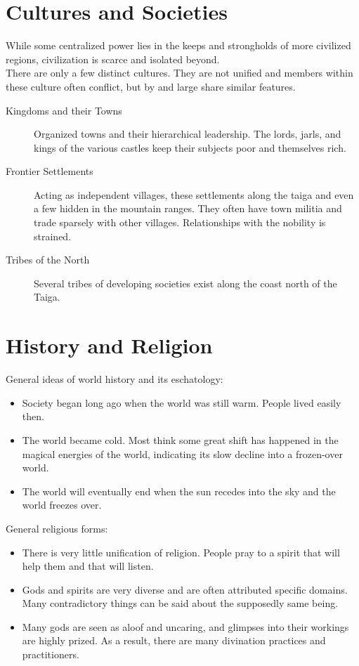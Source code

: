 \documentclass{article}
\begin{document}
\begin{multicols}{2}
\section{Cultures and Societies}

While some centralized power lies in the keeps and strongholds of more civilized regions, civilization is scarce and isolated beyond. \\

There are only a few distinct cultures. They are not unified and members within these culture often conflict, but by and large share similar features.

\begin{description}
\item[Kingdoms and their Towns] Organized towns and their hierarchical leadership. The lords, jarls, and kings of the various castles keep their subjects poor and themselves rich. 
\item[Frontier Settlements] Acting as independent villages, these settlements along the taiga and even a few hidden in the mountain ranges. They often have town militia and trade sparsely with other villages. Relationships with the nobility is strained.
\item[Tribes of the North] Several tribes of developing societies exist along the coast north of the Taiga. 
\end{description}


\section{History and Religion}

General ideas of world history and its eschatology:

\begin{itemize}
\item Society began long ago when the world was still warm. People lived easily then.
\item The world became cold. Most think some great shift has happened in the magical energies of the world, indicating its slow decline into a frozen-over world.
\item The world will eventually end when the sun recedes into the sky and the world freezes over.
\end{itemize}

General religious forms:

\begin{itemize}
\item There is very little unification of religion. People pray to a spirit that will help them and that will listen.
\item Gods and spirits are very diverse and are often attributed specific domains. Many contradictory things can be said about the supposedly same being.
\item Many gods are seen as aloof and uncaring, and glimpses into their workings are highly prized. As a result, there are many divination practices and practitioners.
\end{itemize}


\end{multicols}
\end{document}

